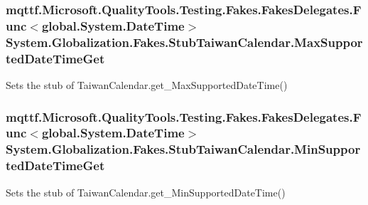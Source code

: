 \hypertarget{class_system_1_1_globalization_1_1_fakes_1_1_stub_taiwan_calendar_a0839233bd4eb93f855b54f39535b9e85}{
\subsubsection[{Max\-Supported\-Date\-Time\-Get}]{\setlength{\rightskip}{0pt plus 5cm}mqttf.\-Microsoft.\-Quality\-Tools.\-Testing.\-Fakes.\-Fakes\-Delegates.\-Func$<$global.\-System.\-Date\-Time$>$ System.\-Globalization.\-Fakes.\-Stub\-Taiwan\-Calendar.\-Max\-Supported\-Date\-Time\-Get}}\label{class_system_1_1_globalization_1_1_fakes_1_1_stub_taiwan_calendar_a0839233bd4eb93f855b54f39535b9e85}


Sets the stub of Taiwan\-Calendar.\-get\-\_\-\-Max\-Supported\-Date\-Time()

\hypertarget{class_system_1_1_globalization_1_1_fakes_1_1_stub_taiwan_calendar_a6fe7abde4bf473b46bb8bdc5862689a9}{
\subsubsection[{Min\-Supported\-Date\-Time\-Get}]{\setlength{\rightskip}{0pt plus 5cm}mqttf.\-Microsoft.\-Quality\-Tools.\-Testing.\-Fakes.\-Fakes\-Delegates.\-Func$<$global.\-System.\-Date\-Time$>$ System.\-Globalization.\-Fakes.\-Stub\-Taiwan\-Calendar.\-Min\-Supported\-Date\-Time\-Get}}\label{class_system_1_1_globalization_1_1_fakes_1_1_stub_taiwan_calendar_a6fe7abde4bf473b46bb8bdc5862689a9}


Sets the stub of Taiwan\-Calendar.\-get\-\_\-\-Min\-Supported\-Date\-Time()

